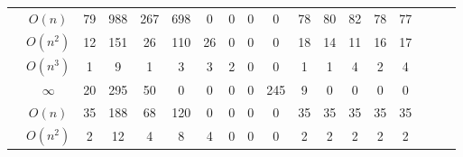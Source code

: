 \begin{table}[ht]
{\begin{tabular}{ | >{\scriptsize}c | >{\scriptsize}c | >{\scriptsize}c | >{\scriptsize}c | >{\scriptsize}c | c | c | c | c | c | c | c | c | c | c | c | c | c |}
    \cline{2-2}
    & $O(n)$ & 79 & 988 & 267 & 698 & 0 & 0 & 0 & 0 & 78 & 80 & 82 & 78 & 77  \\
    \cline{2-2}
    & $O(n^2)$ & 12 & 151 & 26 & 110 & 26 & 0 & 0 & 0 & 18 & 14 & 11 & 16 & 17  \\
    \cline{2-2}
    & $O(n^3)$ & 1 &  9 & 1 & 3 & 3 & 2 & 0 & 0 & 1 & 1 & 4 & 2 & 4  \\
    \cline{2-2}
    & $\infty$ & 20 & 295 &  50 & 0 & 0 & 0 & 0 & 245 & 9 & 0 & 0 & 0 & 0  \\
    \hline \hline
    \multirow{2}{*}{Tianhan} 
    & $O(n)$ & 35 & 188 & 68 & 120 & 0 & 0 & 0 & 0 & 35 & 35 & 35 & 35 & 35  \\
    \cline{2-2}
    & $O(n^2)$ & 2 & 12 & 4 & 8 & 4 & 0 & 0 & 0 & 2 & 2 & 2 & 2 & 2   \\
    \hline
    \end{tabular}
    }
    \end{table}

